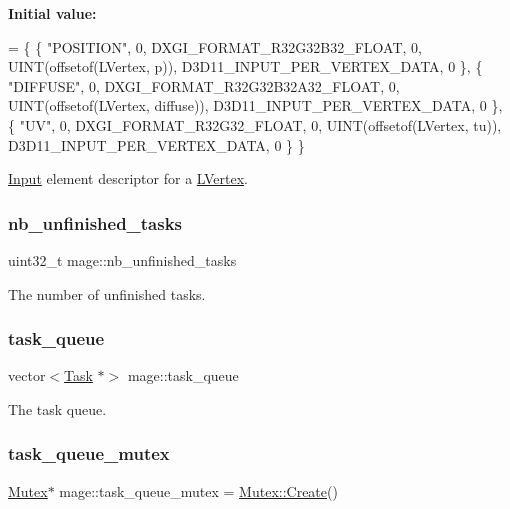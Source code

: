 {\bfseries Initial value\+:}
\begin{DoxyCode}
= \{
        \{ \textcolor{stringliteral}{"POSITION"}, 0, DXGI\_FORMAT\_R32G32B32\_FLOAT, 0, UINT(offsetof(LVertex, p)), 
      D3D11\_INPUT\_PER\_VERTEX\_DATA, 0 \},
        \{ \textcolor{stringliteral}{"DIFFUSE"}, 0, DXGI\_FORMAT\_R32G32B32A32\_FLOAT, 0, UINT(offsetof(LVertex, diffuse)), 
      D3D11\_INPUT\_PER\_VERTEX\_DATA, 0 \},
        \{ \textcolor{stringliteral}{"UV"}, 0, DXGI\_FORMAT\_R32G32\_FLOAT, 0, UINT(offsetof(LVertex, tu)), D3D11\_INPUT\_PER\_VERTEX\_DATA, 0
       \}
    \}
\end{DoxyCode}
\hyperlink{classmage_1_1_input}{Input} element descriptor for a \hyperlink{structmage_1_1_l_vertex}{L\+Vertex}. \hypertarget{namespacemage_a390e8652d67667609daf3aa64e3c00a8}{}\label{namespacemage_a390e8652d67667609daf3aa64e3c00a8} 
\subsubsection{\texorpdfstring{nb\+\_\+unfinished\+\_\+tasks}{nb\_unfinished\_tasks}}
{\footnotesize\ttfamily uint32\+\_\+t mage\+::nb\+\_\+unfinished\+\_\+tasks\hspace{0.3cm}{\ttfamily [static]}}

The number of unfinished tasks. \hypertarget{namespacemage_af4824558d428695e4661c5e7cdfa4419}{}\label{namespacemage_af4824558d428695e4661c5e7cdfa4419} 
\subsubsection{\texorpdfstring{task\+\_\+queue}{task\_queue}}
{\footnotesize\ttfamily vector$<$\hyperlink{classmage_1_1_task}{Task} $\ast$$>$ mage\+::task\+\_\+queue\hspace{0.3cm}{\ttfamily [static]}}

The task queue. \hypertarget{namespacemage_a7de4544ddddcf8e0d54dbfdc0778f13f}{}\label{namespacemage_a7de4544ddddcf8e0d54dbfdc0778f13f} 
\subsubsection{\texorpdfstring{task\+\_\+queue\+\_\+mutex}{task\_queue\_mutex}}
{\footnotesize\ttfamily \hyperlink{classmage_1_1_mutex}{Mutex}$\ast$ mage\+::task\+\_\+queue\+\_\+mutex = \hyperlink{classmage_1_1_mutex_a48d784fa6bffd4088d9f89a2a9cca84e}{Mutex\+::\+Create}()\hspace{0.3cm}{\ttfamily [static]}}

